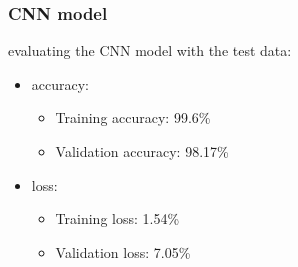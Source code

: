 \subsubsection{CNN model}
evaluating the CNN model with the test data:
\firmlist
		\begin{itemize}
			\item accuracy:
				\begin{itemize}
					\item Training accuracy: 99.6\%
					\item Validation accuracy: 98.17\%
				\end{itemize}
			\item loss:
				\begin{itemize}
					\item Training loss: 1.54\%
					\item Validation loss: 7.05\%
				\end{itemize}
		\end{itemize}


		
		



		\newpage



